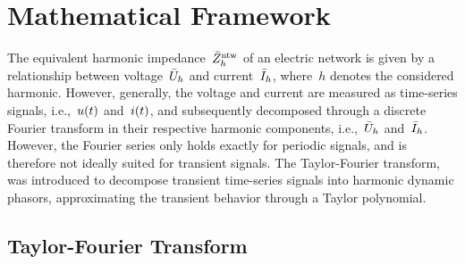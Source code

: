\newcommand{\SignalPhasor}[1]{\bar{S}_{#1}}
\newcommand{\SignalDynamicPhasor}[1]{\SignalPhasor{#1}(\Time)}

\newcommand{\NaturalNumbers}{\mathbb{N}_{0}}

\newcommand{\HilbertSpace}{L_{2}(\mathcal{R})}

\newcommand{\Harmonic}{h}
\newcommand{\HarmonicSet}{\mathcal{H}}

\newcommand{\AmplitudeTimeSeries}[1]{a_{#1}(\Time)}
\newcommand{\AntiRotatingPhaseTimeSeries}[1]{\varphi_{#1}(\Time)}

\newcommand{\CurrentDynamicPhasor}[1]{\CurrentPhasor{#1}(\Time)}

\newcommand{\VoltageDynamicPhasor}[1]{\VoltagePhasor{#1}(\Time)}

\section{Mathematical Framework}
\label{sec:mathematical_framework}

The equivalent harmonic impedance~$\ImpedancePhasor{\Harmonic}^{\text{ntw}}$ of an electric network is given by a relationship between voltage~$\VoltagePhasor{\Harmonic}$ and current~$\CurrentPhasor{\Harmonic}$, where~$\Harmonic$ denotes the considered harmonic. However, generally, the voltage and current are measured as time-series signals, i.e.,~$u(t)$ and~$i(t)$, and subsequently decomposed through a discrete Fourier transform in their respective harmonic components, i.e.,~$\VoltagePhasor{\Harmonic}$ and~$\CurrentPhasor{\Harmonic}$. However, the Fourier series only holds exactly for periodic signals, and is therefore not ideally suited for transient signals. The Taylor-Fourier transform, was introduced to decompose transient time-series signals into harmonic dynamic phasors, approximating the transient behavior through a Taylor polynomial. 

\subsection{Taylor-Fourier Transform}
\label{sec:taylor_fourier_transform}

